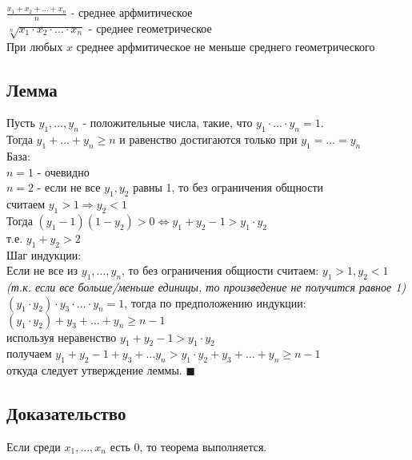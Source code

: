 \documentclass[letterpaper]{article}
\begin{document}
\(\frac{x_1 + x_2 + \ldots + x_n}{n}\) - среднее арфмитическое\\

\(\sqrt[n]{x_1 \cdot x_2 \cdot \ldots \cdot x_n}\) - среднее геометрическое\\

При любых \(x\) среднее арфмитическое не меньше среднего геометрического\\
\subsection{Лемма}
\label{sec:org0401369}
Пусть \(y_1, \ldots, y_n\) - положительные числа, такие, что \(y_1 \cdot ... \cdot y_n = 1\).\\

Тогда \(y_1 + \ldots + y_n \geq n\) и равенство достигаются только при \(y_1 = \ldots = y_n\)\\

База:\\
\(n = 1\) - очевидно\\

\(n = 2\) - если не все \(y_1, y_2\) равны 1, то без ограничения общности\\
считаем \(y_1 > 1 \Rightarrow y_2 < 1\)\\

Тогда \((y_1 - 1)(1 - y_2) > 0 \iff y_1 + y_2 - 1 > y_1 \cdot y_2\)\\
т.е. \(y_1 + y_2 > 2\)\\

Шаг индукции:\\
Если не все из \(y_1, \ldots, y_n\), то без ограничения общности считаем: \(y_1 > 1, y_2 < 1\)\\

\emph{(т.к. если все больше/меньше единицы, то произведение не получится равное 1)}\\

\((y_1 \cdot y_2) \cdot y_3 \cdot \ldots \cdot y_n = 1\), тогда по предположению индукции:\\

\((y_1 \cdot y_2) + y_3 + \ldots + y_n \geq n - 1\)\\
используя неравенство \(y_1 + y_2 - 1 > y_1 \cdot y_2\)\\
получаем \(y_1 + y_2 - 1 + y_3 + \ldots y_n > y_1 \cdot y_2 + y_3 + \ldots + y_n \geq n - 1\)\\
откуда следует утверждение леммы. \(\blacksquare\)\\
\subsection{Доказательство}
\label{sec:org305f7fc}
Если среди \(x_1, \ldots, x_n\) есть 0, то теорема выполняется.\\
\end{document}
